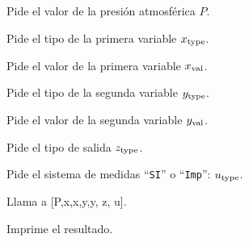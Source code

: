 \documentclass[letterpaper]{article}
\begin{document}
\subsection{}
Pide el valor de la presión atmosférica $P$.

Pide el tipo de la primera variable $x\type$.

Pide el valor de la primera variable $x\val$.

Pide el tipo de la segunda variable $y\type$.

Pide el valor de la segunda variable $y\val$.

Pide el tipo de salida $z\type$.

Pide el sistema de medidas ``\texttt{SI}'' o ``\texttt{Imp}'': $u\type$.

Llama a [P,x\type,x\val,y\type,y\val, z\type, u\type].

Imprime el resultado.
\end{document}

